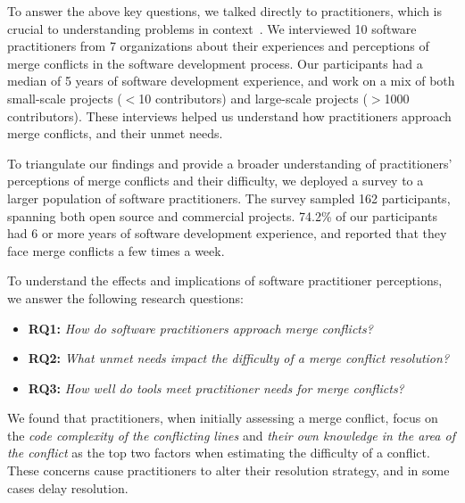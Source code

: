 To answer the above key questions, we talked directly to practitioners, which is crucial to understanding problems in context~\cite{fritz2010using, sillito2006questions, de2008answering, ko2007information}.
We interviewed 10 software practitioners from 7 organizations about their experiences and perceptions of merge conflicts in the software development process.
Our participants had a median of 5 years of software development experience, and work on a mix of both small-scale projects ($<$10 contributors) and large-scale projects ($>$1000 contributors).
These interviews helped us understand how practitioners approach merge conflicts, and their unmet needs.

To triangulate our findings and provide a broader understanding of practitioners' perceptions of merge conflicts and their difficulty, we deployed a survey to a larger population of software practitioners.
The survey sampled 162 participants, spanning both open source and commercial projects. 74.2\% of our participants had 6 or more years of software development experience, and reported that they face merge conflicts a few times a week.

To understand the effects and implications of software practitioner perceptions, we answer the following research questions:

\begin{itemize}
\item \textbf{RQ1:} \textit{How do software practitioners approach merge conflicts?}
\item \textbf{RQ2:} \textit{What unmet needs impact the difficulty of a merge conflict resolution?}
\item \textbf{RQ3:} \textit{How well do tools meet practitioner needs for merge conflicts?}
\end{itemize}

We found that practitioners, when initially assessing a merge conflict, focus on the \textit{code complexity of the conflicting lines} and \textit{their own knowledge in the area of the conflict} as the top two factors when estimating the difficulty of a conflict. These concerns cause practitioners to alter their resolution strategy, and in some cases delay resolution.

